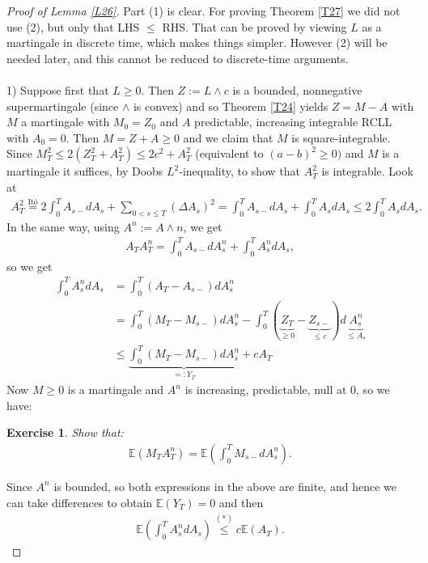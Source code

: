 \documentclass[12pt,a4paper, twoside]{article}
\newtheorem{exe}{Exercise}[section]
\theoremstyle{definition}
\newcommand{\EE}{\mathbb{E}} %
\begin{document}
\begin{proof}[Proof of Lemma \ref{L26}] Part (1) is clear. For proving Theorem \ref{T27} we did not use (2), but only that LHS $\leq$ RHS. That can be proved by viewing $L$ as a martingale in discrete time, which makes things simpler. However (2) will be needed later, and this cannot be reduced to discrete-time arguments.
\\
\\
1) Suppose first that $L \geq 0$. Then $Z:= L \wedge c$ is a bounded, nonnegative supermartingale (since $\wedge$ is convex) and so Theorem \ref{T24} yields $Z=M-A$ with $M$ a martingale with $M_0=Z_0$ and $A$ predictable, increasing integrable RCLL with $A_0=0$. Then $M=Z+A \geq 0$ and we claim that $M$ is square-integrable. Since $M_T^2 \leq 2(Z_T^2 + A_T^2) \leq 2c^2 + A_T^2$ (equivalent to $(a-b)^2 \geq 0)$ and $M$ is a martingale it suffices, by Doobs $L^2$-inequality, to show that $A_T^2$ is integrable. 
\newpage
\noindent Look at 
\begin{align*}
A_T^2 \overset{\text{Itô}} = 2 \int_0^T A_{s-} dA_s + \sum_{0 < s \leq T} ( \Delta A_s)^2 = \int_0^T A_{s-} dA_s + \int_0^T A_s dA_s \leq 2 \int_0 ^T A_sdA_s.
\end{align*}
In the same way, using $A^n:= A \wedge n$, we get 
\begin{align*}
A_TA_T^n = \int_0 ^T A_{s-} dA_s^n + \int_0^T A_s^n dA_s,
\end{align*}
so we get  
\begin{align*}
\int_0^T A_s^n dA_s &= \int_0^T(A_T-A_{s-})dA_s^n \\
&= \int_0^T ( M_T-M_{s-}) dA_s^n- \int_0^T(\underbrace{Z_T}_{ \geq 0}-\underbrace{Z_{s-}}_{ \leq c})d\underbrace{A_s^n}_{\leq A_s}  \\
& \leq \underbrace{\int_0^T (M_T-M_{s-}) dA_s^n}_{=:Y_T} + cA_T \tag{*}
\end{align*}
Now $M \geq 0$ is a martingale and $A^n$ is increasing, predictable, null at $0$, so we have:
\begin{exe} \label{ex4} Show that:
\begin{align*}
\EE(M_TA_T^n)= \EE \left( \int_0^T M_{s-} dA_s^n \right). 
\end{align*}
\end{exe}
Since $A^n$ is bounded, so both expressions in the above are finite, and hence we can take differences to obtain $\mathbb{E}(Y_T)=0$ and then 
\begin{align*}
\EE \left( \int_0^T A_s^n dA_s \right) \overset{(*)}\leq c \EE(A_T).
\end{align*}

\end{proof}
\end{document}
